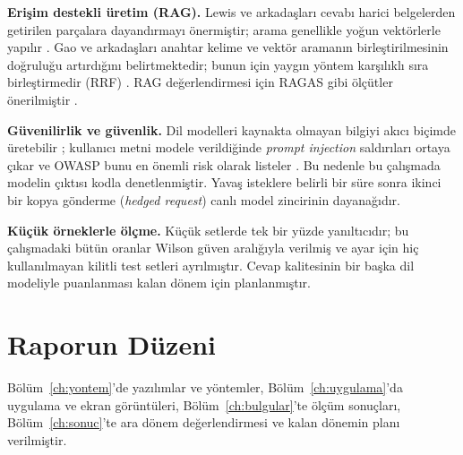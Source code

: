 \textbf{Erişim destekli üretim (RAG).} Lewis ve arkadaşları \cite{lewis2020} cevabı harici belgelerden
getirilen parçalara dayandırmayı önermiştir; arama genellikle yoğun vektörlerle yapılır
\cite{karpukhin2020,johnson2019}. Gao ve arkadaşları \cite{gao2023} anahtar kelime ve vektör aramanın
birleştirilmesinin doğruluğu artırdığını belirtmektedir; bunun için yaygın yöntem karşılıklı sıra
birleştirmedir (RRF) \cite{cormack2009}. RAG değerlendirmesi için RAGAS gibi ölçütler önerilmiştir
\cite{es2024}.

\textbf{Güvenilirlik ve güvenlik.} Dil modelleri kaynakta olmayan bilgiyi akıcı biçimde üretebilir
\cite{ji2023}; kullanıcı metni modele verildiğinde \textit{prompt injection} saldırıları ortaya çıkar
\cite{perez2022,greshake2023} ve OWASP bunu en önemli risk olarak listeler \cite{owasp2025}. Bu
nedenle bu çalışmada modelin çıktısı kodla denetlenmiştir. Yavaş isteklere belirli bir süre sonra
ikinci bir kopya gönderme (\textit{hedged request}) \cite{dean2013} canlı model zincirinin dayanağıdır.

\textbf{Küçük örneklerle ölçme.} Küçük setlerde tek bir yüzde yanıltıcıdır; bu çalışmadaki bütün
oranlar Wilson \cite{wilson1927} güven aralığıyla verilmiş ve ayar için hiç kullanılmayan kilitli test
setleri ayrılmıştır. Cevap kalitesinin bir başka dil modeliyle puanlanması \cite{zheng2023} kalan dönem
için planlanmıştır.

\section{Raporun Düzeni}

Bölüm~\ref{ch:yontem}'de yazılımlar ve yöntemler,
Bölüm~\ref{ch:uygulama}'da uygulama ve ekran görüntüleri, Bölüm~\ref{ch:bulgular}'te ölçüm sonuçları,
Bölüm~\ref{ch:sonuc}'te ara dönem değerlendirmesi ve kalan dönemin planı verilmiştir.
